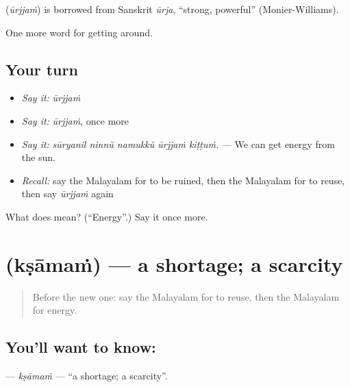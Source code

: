 \begin{cousinweb}
\textbf{} (\emph{ūrjjaṁ}) is borrowed from Sanskrit \emph{ūrja}, \textquotedblleft{}strong, powerful\textquotedblright{} (Monier-Williams).
\end{cousinweb}

\begin{grammarlens}[title={What you've built}]
One more word for getting around.
\end{grammarlens}

\subsection*{Your turn}
\begin{itemize}
\raggedright
  \item \emph{Say it:} \emph{ūrjjaṁ}
  \item \emph{Say it:} \emph{ūrjjaṁ}, once more
  \item \emph{Say it:} \emph{sūryanil ninnŭ namukkŭ ūrjjaṁ kiṭṭuṁ.} — We can get energy from the sun.
  \item \emph{Recall:} say the Malayalam for to be ruined, then the Malayalam for to reuse, then say \emph{ūrjjaṁ} again
\end{itemize}

\begin{tcolorbox}[breakable,colback=teal!4,colframe=teal!35!black,title={Before you move on}]
What does  mean? (\textquotedblleft{}Energy\textquotedblright{}.) Say it once more.
\end{tcolorbox}
\section[\texorpdfstring{\ml{ക്ഷാമം} (kṣāmaṁ)}{ക്ഷാമം (kṣāmaṁ)}]{ (kṣāmaṁ) — a shortage; a scarcity}

\label{lesson:ML-C505-ksamam}



\begin{quote}
Before the new one: say the Malayalam for to reuse, then the Malayalam for energy.
\end{quote}

\subsection*{You'll want to know: }
\textbf{} — \emph{kṣāmaṁ} — \textquotedblleft{}a shortage; a scarcity\textquotedblright{}.

